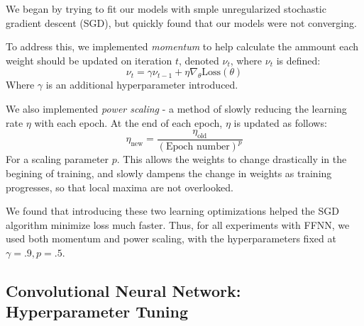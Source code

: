 \documentclass[letterpaper, 10 pt, conference]{ieeeconf}  %
\begin{document}
We began by trying to fit our models with smple unregularized stochastic gradient descent (SGD), but quickly found that our models were not converging. 

To address this, we implemented \emph{momentum} to help calculate the ammount each weight should be updated on iteration $t$, denoted $\nu_t$, where $\nu_t$ is defined:
$$
\nu_t = \gamma\nu_{t-1} + \eta\nabla_{\theta}\text{Loss}(\theta)
$$
Where $\gamma$ is an additional hyperparameter introduced. 

We also implemented \emph{power scaling} - a method of slowly reducing the learning rate $\eta$ with each epoch. At the end of each epoch, $\eta$ is updated as follows:
$$
\eta_{\text{new}} = \frac{\eta_{\text{old}}}{(\text{Epoch number})^{p}}
$$
For a scaling parameter $p$. This allows the weights to change drastically in the begining of training, and slowly dampens the change in weights as training progresses, so that local maxima are not overlooked. 

We found that introducing these two learning optimizations helped the SGD algorithm minimize loss much faster. Thus, for all experiments with FFNN, we used both momentum and power scaling, with the hyperparameters fixed at $\gamma = .9, p = .5$. 

\subsection{Convolutional Neural Network: Hyperparameter Tuning} 
\end{document}
